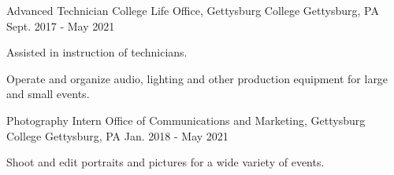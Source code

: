 \begin{cventries}

\cventry
{Advanced Technician} %
{College Life Office, Gettysburg College} %
{Gettysburg, PA} %
{Sept. 2017 - May 2021} %
{ %
\begin{cvitems}
\item {Assisted in instruction of technicians.}
\item {Operate and organize audio, lighting and other production equipment for large and small events.}
\end{cvitems}
}


\cventry
{Photography Intern} %
{Office of Communications and Marketing, Gettysburg College} %
{Gettysburg, PA} %
{Jan. 2018 - May 2021} %
{ %
\begin{cvitems}
\item {Shoot and edit portraits and pictures for a wide variety of events.}
\end{cvitems}
}


\end{cventries}